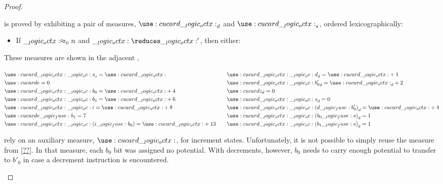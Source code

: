 \begin{proof}
\begin{description}
    is proved by exhibiting a pair of measures, $\card{\octx}_d$ and $\card{\octx}_s$, ordered lexicographically:
    \begin{itemize}
    \item If $\__logic_octx: \approx\sb{\text{\normalfont\scshape d}} n$ and $\octx \reduces \octx'$, then either:
    \end{itemize}
    These measures are shown in the adjacent , %
    \begin{marginfigure}
      \begin{equation*}
        \begin{lgathered}[t]
          \card{\octx \oc s}_s = \card{\octx} \\
          \card{e} = 0 \\
          \card{\octx \oc b_0} = \card{\octx} + 4 \\
          \card{\octx \oc b_1} = \card{\octx} + 6 \\
          \card{\octx \oc i} = \card{\octx} + 8 \\
          \card{e \fuse b_1} = 7 \\
          \card{\octx \oc (i \fuse b_0)} = \card{\octx} + 13
        \end{lgathered}
        \qquad
        \begin{lgathered}[t]
          \card{\octx \oc d}_d = \card{\octx} + 1 \\
          \card{\octx \oc b'_0}_d = \card{\octx}_d + 2 \\
          \card{z}_d = 0 \\
          \card{\octx \oc s}_d = 0 \\
          \card{\octx \oc (d \fuse b'_0)}_d = \card{\octx} + 4 \\
          \card{\octx \oc (b_0 \fuse s)}_d = 1 \\
          \card{\octx \oc (b_1 \fuse s)}_d = 1
        \end{lgathered}
      \end{equation*}
    \end{marginfigure}
    rely on an auxiliary measure, $\card{\octx}$, for increment states.
    Unfortunately, it is not possible to simply reuse the measure from \cref{??}.
    In that measure, each $b_0$ bit was assigned no potential.
    With decrements, however, $b_0$ needs to carry enough potential to transfer to $b'_0$ in case a decrement instruction is encountered.


\end{description}
\end{proof}
